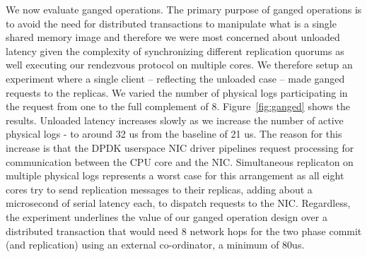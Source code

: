 \documentclass[pageno]{jpaper}
\begin{document}
We now evaluate ganged operations. The primary purpose of
ganged operations is to avoid the need for distributed transactions to
manipulate what is a single shared memory image and therefore we were most
concerned about unloaded latency given the complexity of synchronizing different
replication quorums as well executing our rendezvous protocol on multiple
cores. We therefore setup an experiment where a single client -- reflecting the
unloaded case -- made ganged requests to the replicas. We varied the number of
physical logs participating in the request from one to the full complement of 8.
Figure~\ref{fig:ganged} shows the results. Unloaded
latency increases slowly as we increase the number of active physical logs - to
around 32 us from the baseline of 21 us. The reason for this increase is that
the DPDK userspace NIC driver pipelines request processing for communication
between the CPU core and the NIC. Simultaneous replicaton on multiple physical
logs represents a worst case for this arrangement as all eight cores try to
send replication messages to their replicas, adding about a microsecond of
serial latency each, to dispatch requests to the NIC. Regardless, the experiment
underlines the value of our ganged operation design over a distributed
transaction that would need 8 network hops for the two phase commit (and
replication) using an external co-ordinator, a minimum of 80us.
\end{document}
